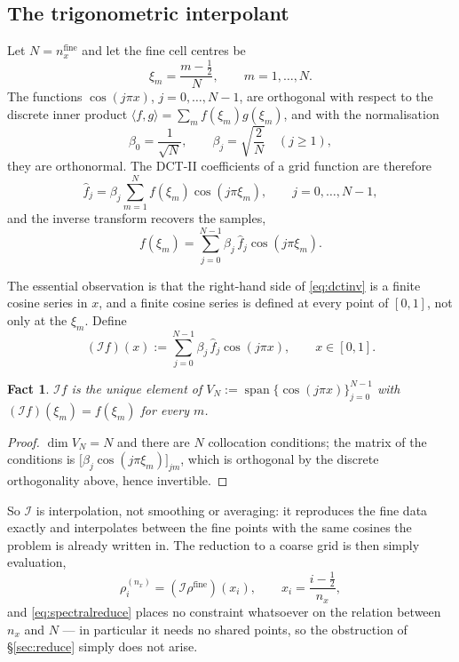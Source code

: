 \documentclass[11pt]{article}
\newtheorem{fact}{Fact}
\begin{document}
\subsection{The trigonometric interpolant}

Let $N=n_x^{\text{fine}}$ and let the fine cell centres be
\begin{equation}
  \xi_m = \frac{m-\tfrac12}{N},\qquad m = 1,\dots,N .
\end{equation}
The functions $\cos(j\pi x)$, $j=0,\dots,N-1$, are orthogonal with respect to
the discrete inner product $\langle f,g\rangle=\sum_{m}f(\xi_m)g(\xi_m)$, and
with the normalisation
\begin{equation}
  \beta_0 = \frac{1}{\sqrt N},
  \qquad
  \beta_j = \sqrt{\frac{2}{N}}\quad (j\ge1),
\end{equation}
they are orthonormal. The DCT-II coefficients of a grid function are therefore
\begin{equation}
  \hat f_j = \beta_j\sum_{m=1}^{N} f(\xi_m)\cos\!\left(j\pi\xi_m\right),
  \qquad j = 0,\dots,N-1,
  \label{eq:dctfwd}
\end{equation}
and the inverse transform recovers the samples,
\begin{equation}
  f(\xi_m) = \sum_{j=0}^{N-1}\beta_j\,\hat f_j\cos\!\left(j\pi\xi_m\right).
  \label{eq:dctinv}
\end{equation}

The essential observation is that the right-hand side of \eqref{eq:dctinv} is a
finite cosine series in $x$, and a finite cosine series is defined at every
point of $[0,1]$, not only at the $\xi_m$. Define
\begin{equation}
  \boxed{\;
  (\mathcal{I}f)(x) := \sum_{j=0}^{N-1}\beta_j\,\hat f_j\cos\!\left(j\pi x\right),
  \qquad x\in[0,1].\;}
  \label{eq:interpolant}
\end{equation}

\begin{fact}
$\mathcal{I}f$ is the unique element of
$V_N := \operatorname{span}\{\cos(j\pi x)\}_{j=0}^{N-1}$ with
$(\mathcal{I}f)(\xi_m)=f(\xi_m)$ for every $m$.
\end{fact}
\begin{proof}
$\dim V_N = N$ and there are $N$ collocation conditions; the matrix of the
conditions is $\bigl[\beta_j\cos(j\pi\xi_m)\bigr]_{jm}$, which is orthogonal by
the discrete orthogonality above, hence invertible.
\end{proof}

\noindent
So $\mathcal{I}$ is interpolation, not smoothing or averaging: it reproduces the
fine data exactly and interpolates between the fine points with the same
cosines the problem is already written in. The reduction to a coarse grid is
then simply evaluation,
\begin{equation}
  \rho^{(n_x)}_i = (\mathcal{I}\rho^{\text{fine}})(x_i),
  \qquad x_i = \frac{i-\tfrac12}{n_x},
  \label{eq:spectralreduce}
\end{equation}
and \eqref{eq:spectralreduce} places no constraint whatsoever on the relation
between $n_x$ and $N$ --- in particular it needs no shared points, so the
obstruction of \S\ref{sec:reduce} simply does not arise.
\end{document}
